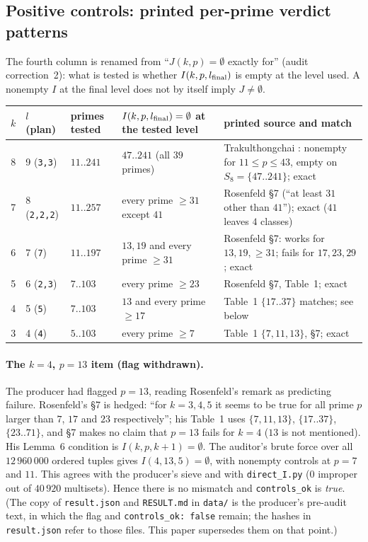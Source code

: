 \documentclass[10pt]{article}
\begin{document}
\subsection{Positive controls: printed per-prime verdict patterns}
The fourth column is renamed from ``$J(k,p)=\emptyset$ exactly for'' (audit correction~2): what is tested is whether $I(k,p,l_{\rm final})$ is empty at the level used. A nonempty $I$ at the final level does not by itself imply $J\ne\emptyset$.
\begin{center}\small\begin{tabular}{rl p{2.2cm} p{3.4cm} p{4.4cm}}\toprule
$k$ & $l$ (plan) & primes tested & $I(k,p,l_{\rm final})=\emptyset$ at the tested level & printed source and match\\\midrule
8 & 9 (\texttt{3,3}) & $11..241$ & $47..241$ (all $39$ primes) & Trakulthongchai \cite{trak8}: nonempty for $11\le p\le43$, empty on $S_8=\{47..241\}$; exact\\
7 & 8 (\texttt{2,2,2}) & $11..257$ & every prime $\ge31$ except $41$ & Rosenfeld \cite{ros} \S7 (``at least $31$ other than $41$''); exact ($41$ leaves $4$ classes)\\
6 & 7 (\texttt{7}) & $11..197$ & $13,19$ and every prime $\ge31$ & Rosenfeld \S7: works for $13,19,\ge31$; fails for $17,23,29$; exact\\
5 & 6 (\texttt{2,3}) & $7..103$ & every prime $\ge23$ & Rosenfeld \S7, Table~1; exact\\
4 & 5 (\texttt{5}) & $7..103$ & $13$ and every prime $\ge17$ & Table~1 $\{17..37\}$ matches; see below\\
3 & 4 (\texttt{4}) & $5..103$ & every prime $\ge7$ & Table~1 $\{7,11,13\}$, \S7; exact\\\bottomrule
\end{tabular}\end{center}
\paragraph{The $k=4$, $p=13$ item (flag withdrawn).} The producer had flagged $p=13$, reading Rosenfeld's remark as predicting failure. Rosenfeld's \S7 is hedged: ``for $k=3,4,5$ it seems to be true for all prime $p$ larger than $7$, $17$ and $23$ respectively''; his Table~1 uses $\{7,11,13\}$, $\{17..37\}$, $\{23..71\}$, and \S7 makes no claim that $p=13$ fails for $k=4$ ($13$ is not mentioned). His Lemma~6 condition is $I(k,p,k+1)=\emptyset$. The auditor's brute force over all $12\,960\,000$ ordered tuples gives $I(4,13,5)=\emptyset$, with nonempty controls at $p=7$ and $11$. This agrees with the producer's sieve and with \texttt{direct\_I.py} ($0$ improper out of $40\,920$ multisets). Hence there is no mismatch and \texttt{controls\_ok} is \emph{true}. (The copy of \texttt{result.json} and \texttt{RESULT.md} in \texttt{data/} is the producer's pre-audit text, in which the flag and \texttt{controls\_ok: false} remain; the hashes in \texttt{result.json} refer to those files. This paper supersedes them on that point.)
\end{document}

